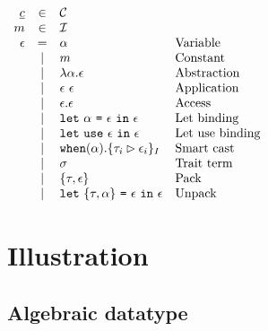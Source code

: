 \documentclass{article}[11pt]
\newcommand{\term}[1]{\verb~#1~}
\begin{document}
    \begin{math}
        \begin{array}{rclp{5cm}}
            \underline{c} & \in & {\cal C} \\
            m & \in & {\cal I} \\
            \epsilon & =
            & \alpha & Variable \\
            & \mid & m                                                                       & Constant        \\
            & \mid & \lambda \alpha . \epsilon                                               & Abstraction     \\
            & \mid & \epsilon~\epsilon                                                       & Application     \\
            & \mid & \epsilon . \epsilon                                                     & Access          \\
            & \mid & \term{let}~\alpha ~ \term{=} ~ \epsilon ~\term{in}~\epsilon             & Let~binding     \\
            & \mid & \term{let}~\term{use} ~ \epsilon ~\term{in}~\epsilon                    & Let~use~binding \\
            & \mid & \term{when}(\alpha).\{ \tau_i \rhd \epsilon_i \}_I                      & Smart cast      \\
            & \mid & \sigma                                                                  & Trait~term      \\
            & \mid & \{\tau, \epsilon\}                                                      & Pack            \\
            & \mid & \term{let} ~ \{\tau, \alpha\} ~ \term{=} ~ \epsilon ~\term{in}~\epsilon & Unpack          \\
        \end{array}
    \end{math}


    \section{Illustration}\label{sec:illustration}

    \subsection{Algebraic datatype}\label{subsec:algebraic-datatype}
\end{document}

